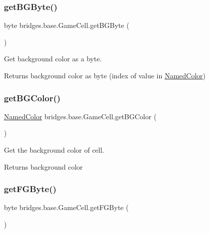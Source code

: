 \subsubsection{\texorpdfstring{get\+B\+G\+Byte()}{getBGByte()}}
{\footnotesize\ttfamily byte bridges.\+base.\+Game\+Cell.\+get\+B\+G\+Byte (\begin{DoxyParamCaption}{ }\end{DoxyParamCaption})}



Get background color as a byte. 

\begin{DoxyReturn}{Returns}
background color as byte (index of value in \hyperlink{enumbridges_1_1base_1_1_named_color}{Named\+Color}) 
\end{DoxyReturn}
\mbox{\label{classbridges_1_1base_1_1_game_cell_a7e910723cc5a678ef75f24f993b0c2ca}} 
\subsubsection{\texorpdfstring{get\+B\+G\+Color()}{getBGColor()}}
{\footnotesize\ttfamily \hyperlink{enumbridges_1_1base_1_1_named_color}{Named\+Color} bridges.\+base.\+Game\+Cell.\+get\+B\+G\+Color (\begin{DoxyParamCaption}{ }\end{DoxyParamCaption})}



Get the background color of cell. 

\begin{DoxyReturn}{Returns}
background color 
\end{DoxyReturn}
\mbox{\label{classbridges_1_1base_1_1_game_cell_ad1a05ce3e8ca8e148d867e6248023253}} 
\subsubsection{\texorpdfstring{get\+F\+G\+Byte()}{getFGByte()}}
{\footnotesize\ttfamily byte bridges.\+base.\+Game\+Cell.\+get\+F\+G\+Byte (\begin{DoxyParamCaption}{ }\end{DoxyParamCaption})}



